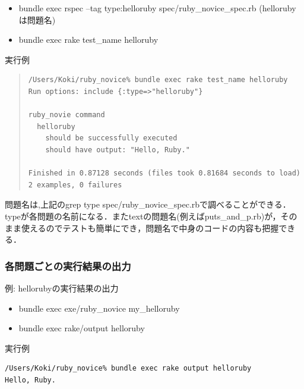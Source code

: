 \begin{itemize}
\item bundle exec rspec --tag type:helloruby spec/ruby\_novice\_spec.rb  (hellorubyは問題名)
\end{itemize}
\begin{itemize}
\item bundle exec rake test\_name helloruby
\end{itemize}
実行例
\begin{quote}\begin{verbatim}
/Users/Koki/ruby_novice% bundle exec rake test_name helloruby
Run options: include {:type=>"helloruby"}

ruby_novie command
  helloruby
    should be successfully executed
    should have output: "Hello, Ruby."
		 
Finished in 0.87128 seconds (files took 0.81684 seconds to load)
2 examples, 0 failures
\end{verbatim}\end{quote}
問題名は,上記のgrep type spec/ruby\_novice\_spec.rbで調べることができる．
typeが各問題の名前になる．またtextの問題名(例えばputs\_and\_p.rb)が，そのまま使えるのでテストも簡単にでき，問題名で中身のコードの内容も把握できる． 

\subsubsection{各問題ごとの実行結果の出力}
例: hellorubyの実行結果の出力

\begin{itemize}
\item bundle exec exe/ruby\_novice my\_helloruby
\end{itemize}
\begin{itemize}
\item bundle exec rake/output helloruby
\end{itemize}
実行例
\begin{lstlisting}[style=customRuby]
/Users/Koki/ruby_novice% bundle exec rake output helloruby
Hello, Ruby.
\end{lstlisting}

